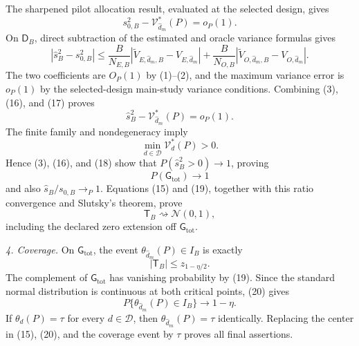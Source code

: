 The sharpened pilot allocation result, evaluated at the selected design, gives
\[
 s_{0,B}^2-\mathcal V_{\widehat d_m}^*(P)=o_P(1). \tag{16}
\]
On \(\mathsf D_B\), direct subtraction of the estimated and oracle variance formulas gives
\[
 |\widehat s_B^2-s_{0,B}^2|
 \le \frac{B}{N_{E,B}}
 |\widetilde V_{E,\widehat d_m,B}-V_{E,\widehat d_m}|
 +\frac{B}{N_{O,B}}
 |\widetilde V_{O,\widehat d_m,B}-V_{O,\widehat d_m}|. \tag{17}
\]
The two coefficients are \(O_P(1)\) by (1)--(2), and the maximum variance error is \(o_P(1)\) by the selected-design main-study variance conditions.  Combining (3), (16), and (17) proves
\[
 \widehat s_B^2-\mathcal V_{\widehat d_m}^*(P)=o_P(1). \tag{18}
\]
The finite family and nondegeneracy imply
\[
 \min_{d\in\mathcal D}\mathcal V_d^*(P)>0.
\]
Hence (3), (16), and (18) show that \(P(\widehat s_B^2>0)\to1\), proving
\[
 P(\mathsf G_{\mathrm{tot}})\longrightarrow1 \tag{19}
\]
and also \(\widehat s_B/s_{0,B}\to_P1\).  Equations (15) and (19), together with this ratio convergence and Slutsky's theorem, prove
\[
 \mathsf T_B\rightsquigarrow\mathcal N(0,1), \tag{20}
\]
including the declared zero extension off \(\mathsf G_{\mathrm{tot}}\).

\emph{4. Coverage.}
On \(\mathsf G_{\mathrm{tot}}\), the event \(\theta_{\widehat d_m}(P)\in I_B\) is exactly
\[
 |\mathsf T_B|\le z_{1-\eta/2}.
\]
The complement of \(\mathsf G_{\mathrm{tot}}\) has vanishing probability by (19).  Since the standard normal distribution is continuous at both critical points, (20) gives
\[
 P\{\theta_{\widehat d_m}(P)\in I_B\}\longrightarrow1-\eta.
\]
If \(\theta_d(P)=\tau\) for every \(d\in\mathcal D\), then \(\theta_{\widehat d_m}(P)=\tau\) identically.  Replacing the center in (15), (20), and the coverage event by \(\tau\) proves all final assertions.